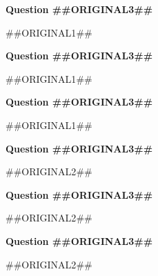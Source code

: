 \documentclass[11pt]{article}
\begin{document}



\begin{minipage}{\linewidth}

\raggedcolumns
\setlength{\columnseprule}{0.5pt}
\begin{multicols}{3}

\textbf{Question ##{{ORIGINAL3}}##} \par
##{{ORIGINAL1}}## \par

\columnbreak

\textbf{Question ##{{ORIGINAL3}}##} \par
##{{ORIGINAL1}}## \par

\columnbreak

\textbf{Question ##{{ORIGINAL3}}##} \par
##{{ORIGINAL1}}## \par

\end{multicols}
\end{minipage}




\begin{minipage}{\linewidth}

\raggedcolumns
\setlength{\columnseprule}{0.5pt}
\begin{multicols}{3}

\textbf{Question ##{{ORIGINAL3}}##} \par
##{{ORIGINAL2}}## \par

\columnbreak

\textbf{Question ##{{ORIGINAL3}}##} \par
##{{ORIGINAL2}}## \par

\columnbreak

\textbf{Question ##{{ORIGINAL3}}##} \par
##{{ORIGINAL2}}## \par

\end{multicols}
\end{minipage}



\end{document}
